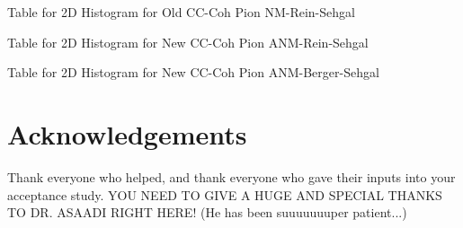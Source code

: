 \documentclass[11pt]{article}
\begin{document}
\newpage
\begin{landscape}
\begin{table}
\centering
\caption{Table for 2D Histogram for Old CC-Coh Pion NM-Rein-Sehgal}
\begin{adjustbox}{width=\paperwidth}
\end{adjustbox}
\end{table}
\end{landscape}

\newpage
\begin{landscape}
\begin{table}
\centering
\caption{Table for 2D Histogram for New CC-Coh Pion ANM-Rein-Sehgal}
\begin{adjustbox}{width=\paperwidth}
\end{adjustbox}
\end{table}
\end{landscape}

\newpage
\begin{landscape}
\begin{table}
\centering
\caption{Table for 2D Histogram for New CC-Coh Pion ANM-Berger-Sehgal}
\begin{adjustbox}{width=\paperwidth}
\end{adjustbox}
\end{table}
\end{landscape}



\section{Acknowledgements}
Thank everyone who helped, and thank everyone who gave their inputs into your acceptance study. YOU NEED TO GIVE A HUGE AND SPECIAL THANKS TO DR. ASAADI RIGHT HERE! (He has been suuuuuuuper patient...)
\end{document}
